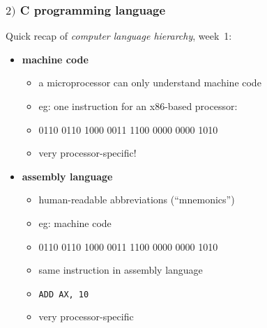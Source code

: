 \documentclass[english,14pt]{beamer}
\newcommand\red[1]{{\color{red} #1}}
\begin{document}

\begin{frame}[fragile]

\frametitle{$2)$ C programming language}

Quick recap of \red{\emph{computer language hierarchy}}, week~1:

\begin{itemize}
	\item \textbf{machine code}
	\begin{itemize}
		\item a microprocessor can only understand machine code
		\item eg: one instruction for an x86-based processor:
		\item[] 0110 0110 1000 0011 1100 0000 0000 1010
		\item very processor-specific!
	\end{itemize}
	
	\item \textbf{assembly language}

	\begin{itemize}
		\item human-readable abbreviations (``mnemonics'')
		\item eg: machine code
		\item[] 0110 0110 1000 0011 1100 0000 0000 1010
		\item same instruction in assembly language
		\item[] \texttt{ADD AX, 10}
		\item very processor-specific
	\end{itemize}
	
\end{itemize}

\end{frame}

\end{document}
